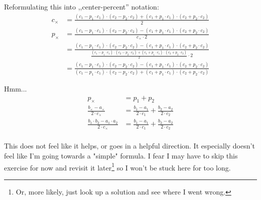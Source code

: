 \documentclass{../../sicp}
\begin{document}
Reformulating this into ,,center-percent'' notation:
\begin{align*}
	c_\times & = \frac{(c_1 - p_1 \cdot c_1) \cdot (c_2 - p_2 \cdot c_2) + (c_1 + p_1 \cdot c_1) \cdot (c_2 + p_2 \cdot c_2)}{2}                                                                                                                       \\
	p_\times & = \frac{(c_1 - p_1 \cdot c_1) \cdot (c_2 - p_2 \cdot c_2) - (c_1 + p_1 \cdot c_1) \cdot (c_2 + p_2 \cdot c_2)}{c_\times \cdot 2}                                                                                                        \\
	         & = \frac{(c_1 - p_1 \cdot c_1) \cdot (c_2 - p_2 \cdot c_2) - (c_1 + p_1 \cdot c_1) \cdot (c_2 + p_2 \cdot c_2)}{\frac{(c_1 - p_1 \cdot c_1) \cdot (c_2 - p_2 \cdot c_2) + (c_1 + p_1 \cdot c_1) \cdot (c_2 + p_2 \cdot c_2)}{2} \cdot 2} \\
	         & = \frac{(c_1 - p_1 \cdot c_1) \cdot (c_2 - p_2 \cdot c_2) - (c_1 + p_1 \cdot c_1) \cdot (c_2 + p_2 \cdot c_2)}{(c_1 - p_1 \cdot c_1) \cdot (c_2 - p_2 \cdot c_2) + (c_1 + p_1 \cdot c_1) \cdot (c_2 + p_2 \cdot c_2)}
\end{align*}

Hmm...
\begin{align*}
	p_\times                                               & = p_1 + p_2                                                     \\
	\frac{b_\times - a_\times}{2 \cdot c_\times}           & = \frac{b_1 - a_1}{2 \cdot c_1} + \frac{b_2 - a_2}{2 \cdot c_2} \\
	\frac{b_1 \cdot b_2 - a_1 \cdot a_2}{2 \cdot c_\times} & = \frac{b_1 - a_1}{2 \cdot c_1} + \frac{b_2 - a_2}{2 \cdot c_2} \\
\end{align*}

This does not feel like it helps, or goes in a helpful direction.
It especially doesn't feel like I'm going towards a "simple" formula.
I fear I may have to skip this exercise for now and revisit it later\footnote{
	Or, more likely, just look up a solution and see where I went wrong.
} so I won't be stuck here for too long.
\end{document}
